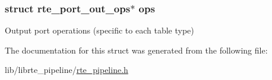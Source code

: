 \subsubsection[{ops}]{\setlength{\rightskip}{0pt plus 5cm}struct {\bf rte\+\_\+port\+\_\+out\+\_\+ops}$\ast$ ops}\label{structrte__pipeline__port__out__params_acbbf5f18df1ca93f322f75ad3dae5e52}
Output port operations (specific to each table type) 

The documentation for this struct was generated from the following file\+:\begin{DoxyCompactItemize}
\item 
lib/librte\+\_\+pipeline/\hyperlink{rte__pipeline_8h}{rte\+\_\+pipeline.\+h}\end{DoxyCompactItemize}
